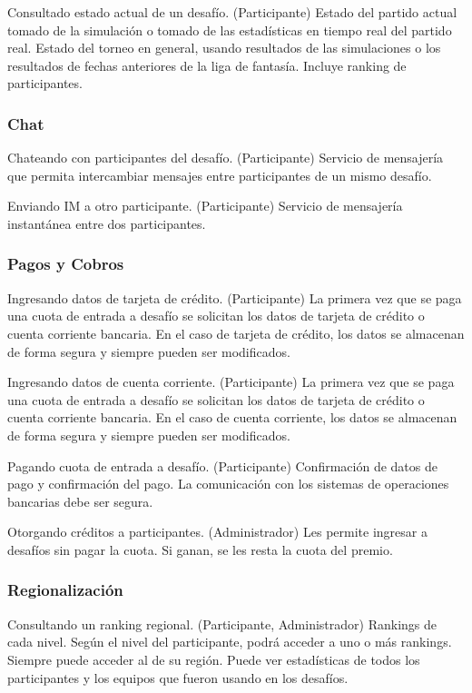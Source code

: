 {Consultado estado actual de un desafío. (Participante)}
{Estado del partido actual tomado de la simulación o tomado de las estadísticas en tiempo real del partido real. Estado del torneo en general, usando resultados de las simulaciones o los resultados de fechas anteriores de la liga de fantasía. Incluye ranking de participantes.}

\subsubsection{Chat}

{Chateando con participantes del desafío. (Participante)}
{Servicio de mensajería que permita intercambiar mensajes entre participantes de un mismo desafío.}

{Enviando IM a otro participante. (Participante)}
{Servicio de mensajería instantánea entre dos participantes.}

\subsubsection{Pagos y Cobros}

{Ingresando datos de tarjeta de crédito. (Participante)}
{La primera vez que se paga una cuota de entrada a desafío se solicitan los datos de tarjeta de crédito o cuenta corriente bancaria. En el caso de tarjeta de crédito, los datos se almacenan de forma segura y siempre pueden ser modificados.}

{Ingresando datos de cuenta corriente. (Participante)}
{La primera vez que se paga una cuota de entrada a desafío se solicitan los datos de tarjeta de crédito o cuenta corriente bancaria. En el caso de cuenta corriente, los datos se almacenan de forma segura y siempre pueden ser modificados.}

{Pagando cuota de entrada a desafío. (Participante)}
{Confirmación de datos de pago y confirmación del pago. La comunicación con los sistemas de operaciones bancarias debe ser segura.}

{Otorgando créditos a participantes. (Administrador)}
{Les permite ingresar a desafíos sin pagar la cuota. Si ganan, se les resta la cuota del premio.}

\subsubsection{Regionalización}

{Consultando un ranking regional. (Participante, Administrador)}
{Rankings de cada nivel. Según el nivel del participante, podrá acceder a uno o más rankings. Siempre puede acceder al de su región. Puede ver estadísticas de todos los participantes y los equipos que fueron usando en los desafíos.}

